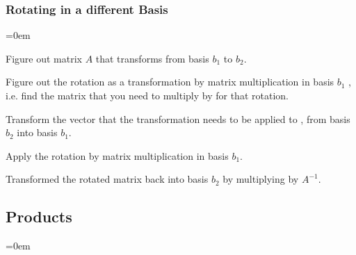


\subsubsectionend

\subsubsection{Rotating in a different Basis}
\label{sssec:rotating_in_a_different_basis}
\parindent=0em

Figure out matrix \( A \) that transforms from basis \( b_1 \) to \( b_2 \).

Figure out the rotation as a transformation by matrix multiplication in basis \( b_1 \) , i.e. find the matrix that you need to multiply by for that rotation.

Transform the vector that the transformation needs to be applied to , from basis \( b_2 \) into basis \( b_1 \).

Apply the rotation by matrix multiplication in basis \( b_1 \).

Transformed the rotated matrix back into basis \( b_2 \) by multiplying by \( A^{-1} \).



\subsubsectionend

\subsectionend

\subsection{Products}
\label{ssec:products}
\parindent=0em

